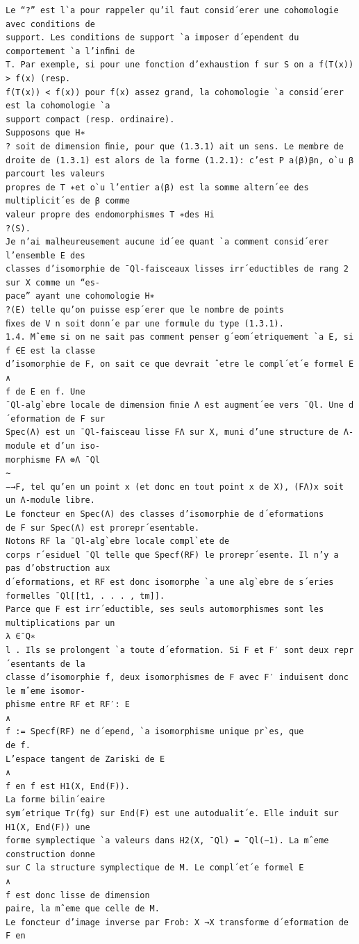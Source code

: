 \documentclass[11pt]{article}
\begin{document}
\begin{Verbatim}[breaklines=true,fontsize=\small]
Le “?” est l`a pour rappeler qu’il faut consid´erer une cohomologie avec conditions de
support. Les conditions de support `a imposer d´ependent du comportement `a l’inﬁni de
T. Par exemple, si pour une fonction d’exhaustion f sur S on a f(T(x)) > f(x) (resp.
f(T(x)) < f(x)) pour f(x) assez grand, la cohomologie `a consid´erer est la cohomologie `a
support compact (resp. ordinaire).
Supposons que H∗
? soit de dimension ﬁnie, pour que (1.3.1) ait un sens. Le membre de
droite de (1.3.1) est alors de la forme (1.2.1): c’est P a(β)βn, o`u β parcourt les valeurs
propres de T ∗et o`u l’entier a(β) est la somme altern´ee des multiplicit´es de β comme
valeur propre des endomorphismes T ∗des Hi
?(S).
Je n’ai malheureusement aucune id´ee quant `a comment consid´erer l’ensemble E des
classes d’isomorphie de ¯Ql-faisceaux lisses irr´eductibles de rang 2 sur X comme un “es-
pace” ayant une cohomologie H∗
?(E) telle qu’on puisse esp´erer que le nombre de points
ﬁxes de V n soit donn´e par une formule du type (1.3.1).
1.4. Mˆeme si on ne sait pas comment penser g´eom´etriquement `a E, si f ∈E est la classe
d’isomorphie de F, on sait ce que devrait ˆetre le compl´et´e formel E
∧
f de E en f. Une
¯Ql-alg`ebre locale de dimension ﬁnie Λ est augment´ee vers ¯Ql. Une d´eformation de F sur
Spec(Λ) est un ¯Ql-faisceau lisse FΛ sur X, muni d’une structure de Λ-module et d’un iso-
morphisme FΛ ⊗Λ ¯Ql
∼
−→F, tel qu’en un point x (et donc en tout point x de X), (FΛ)x soit
un Λ-module libre.
Le foncteur en Spec(Λ) des classes d’isomorphie de d´eformations
de F sur Spec(Λ) est prorepr´esentable.
Notons RF la ¯Ql-alg`ebre locale compl`ete de
corps r´esiduel ¯Ql telle que Specf(RF) le prorepr´esente. Il n’y a pas d’obstruction aux
d´eformations, et RF est donc isomorphe `a une alg`ebre de s´eries formelles ¯Ql[[t1, . . . , tm]].
Parce que F est irr´eductible, ses seuls automorphismes sont les multiplications par un
λ ∈¯Q∗
l . Ils se prolongent `a toute d´eformation. Si F et F′ sont deux repr´esentants de la
classe d’isomorphie f, deux isomorphismes de F avec F′ induisent donc le mˆeme isomor-
phisme entre RF et RF′: E
∧
f := Specf(RF) ne d´epend, `a isomorphisme unique pr`es, que
de f.
L’espace tangent de Zariski de E
∧
f en f est H1(X, End(F)).
La forme bilin´eaire
sym´etrique Tr(fg) sur End(F) est une autodualit´e. Elle induit sur H1(X, End(F)) une
forme symplectique `a valeurs dans H2(X, ¯Ql) = ¯Ql(−1). La mˆeme construction donne
sur C la structure symplectique de M. Le compl´et´e formel E
∧
f est donc lisse de dimension
paire, la mˆeme que celle de M.
Le foncteur d’image inverse par Frob: X →X transforme d´eformation de F en


\end{Verbatim}
\end{document}
